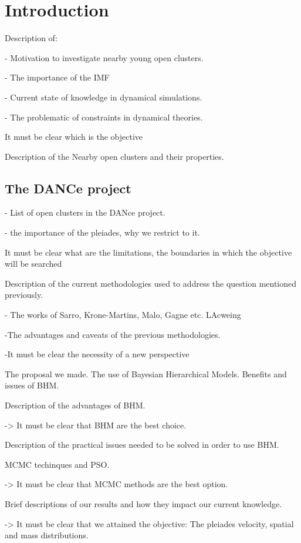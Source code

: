 \chapter{Introduction}
\label{chap:introduction}

\nocite{*} %

Description of:

- Motivation to investigate nearby young open clusters.

- The importance of the IMF

- Current state of knowledge in dynamical simulations.

- The problematic of constraints in dynamical theories.

It must be clear which is the objective

Description of the Nearby open clusters and their properties.

\section{The DANCe project}

- List of open clusters in the DANce project.

- the importance of the pleiades, why we restrict to it.

It must be clear what are the limitations, the boundaries in which the objective will be searched

Description of the current methodologies used to address the question mentioned previously.

- The works of Sarro, Krone-Martins, Malo, Gagne etc. LAcweing

-The advantages and caveats of the previous methodologies. 

-It must be clear the necessity of a new perspective

The proposal we made. The use of Bayesian Hierarchical Models. Benefits and issues of BHM.

Description of the advantages of BHM.

-> It must be clear that BHM are the best choice.

Description of the practical issues needed to be solved in order to use BHM.

MCMC techinques and  PSO.

-> It must be clear that MCMC methods are the best option.

Brief descriptions of our results and how they impact our current knowledge.

-> It must be clear that we attained the objective: The pleiades velocity, spatial and mass distributions.
 



